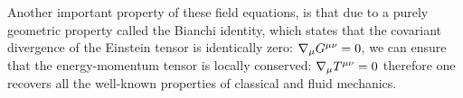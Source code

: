 Another important property of these field equations, is that due to a purely geometric property called the Bianchi identity, which
states that the covariant divergence of the Einstein tensor is identically zero:
$\nabla_{\mu} G^{\mu \nu} = 0$, 
we can ensure that the energy-momentum tensor is locally conserved:
\beeqc$
\nabla_{\mu} T^{\mu \nu} = 0
$
therefore one recovers all the well-known properties of classical and fluid mechanics.



